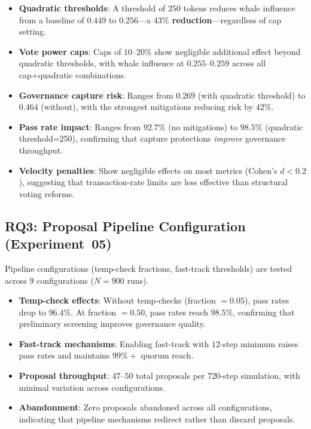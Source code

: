 \begin{itemize}
    \item \textbf{Quadratic thresholds}: A threshold of $250$ tokens reduces whale influence from a baseline of $0.449$ to $0.256$---a \textbf{$43\%$ reduction}---regardless of cap setting.
    \item \textbf{Vote power caps}: Caps of $10$--$20\%$ show negligible additional effect beyond quadratic thresholds, with whale influence at $0.255$--$0.259$ across all cap+quadratic combinations.
    \item \textbf{Governance capture risk}: Ranges from $0.269$ (with quadratic threshold) to $0.464$ (without), with the strongest mitigations reducing risk by $42\%$.
    \item \textbf{Pass rate impact}: Ranges from $92.7\%$ (no mitigations) to $98.5\%$ (quadratic threshold=250), confirming that capture protections \emph{improve} governance throughput.
    \item \textbf{Velocity penalties}: Show negligible effects on most metrics (Cohen's $d < 0.2$), suggesting that transaction-rate limits are less effective than structural voting reforms.
\end{itemize}

\subsection{RQ3: Proposal Pipeline Configuration (Experiment~05)}

Pipeline configurations (temp-check fractions, fast-track thresholds) are tested across $9$ configurations ($N=900$ runs).

\begin{itemize}
    \item \textbf{Temp-check effects}: Without temp-checks (fraction $= 0.05$), pass rates drop to $96.4\%$. At fraction $= 0.50$, pass rates reach $98.5\%$, confirming that preliminary screening improves governance quality.
    \item \textbf{Fast-track mechanisms}: Enabling fast-track with $12$-step minimum raises pass rates and maintains $99\%+$ quorum reach.
    \item \textbf{Proposal throughput}: $47$--$50$ total proposals per $720$-step simulation, with minimal variation across configurations.
    \item \textbf{Abandonment}: Zero proposals abandoned across all configurations, indicating that pipeline mechanisms redirect rather than discard proposals.
\end{itemize}

